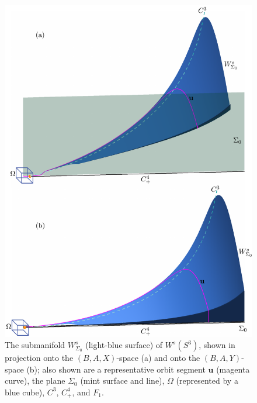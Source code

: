 \documentclass{ws-ijbc}
\begin{document}
\begin{figure}[t!]
\centering
\includegraphics[]{./figures/MKMO_4.pdf}
\caption{The submanifold $W^{s}_{\Sigma_0}$ (light-blue surface) of $W^s(S^3)$, shown in projection onto the $(B,A,X)$-space (a) and onto the $(B,A,Y)$-space (b); also shown are a representative orbit segment $\mathbf{u}$ (magenta curve), the plane $\Sigma_0$ (mint surface and line), $\Omega$ (represented by a blue cube), $C^3$, $C^4_+$, and $F_1$.}
\label{figure_4}
\end{figure}
\end{document}
